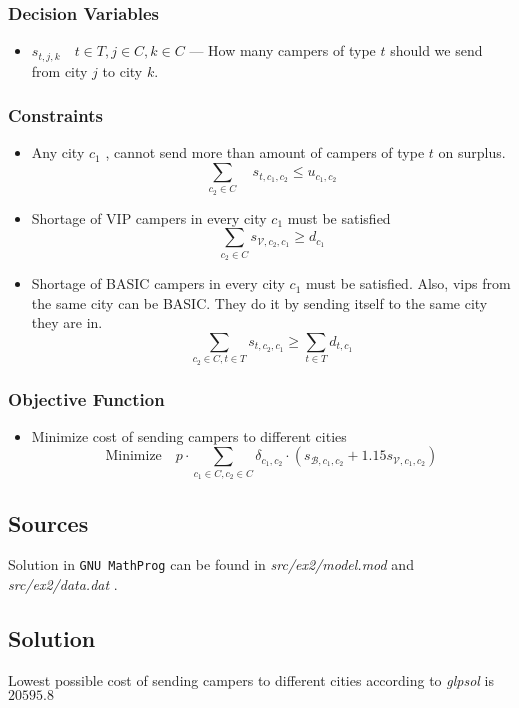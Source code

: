 \subsubsection*{Decision Variables}
\begin{itemize}
    \item $s_{t,j,k} \quad t \in T, j \in C, k \in C$ --- How many campers of type $t$ should we send from city $j$ to city $k$. 
\end{itemize}
\subsubsection*{Constraints}
\begin{itemize}
    \item Any city $c_1$ , cannot send more than amount of campers of type $t$ on surplus.
    $$ \sum_{c_2 \in C} \quad s_{t,c_1,c_2} \leqslant u_{c_1, c_2}$$
    \item Shortage of VIP campers in every city $c_1$ must be satisfied
    $$\sum_{c_2 \in C} s_{\mathcal{V}, c_2, c_1} \geqslant d_{c_1}$$
    \item Shortage of BASIC campers in every city $c_1$ must be satisfied. Also, vips from the same city can be BASIC. They do it by sending itself to the same city they are in.
    $$\sum_{c_2 \in C, t \in T} s_{t, c_2, c_1} \geqslant \sum_{t \in T} d_{t, c_1}$$
\end{itemize}
\subsubsection*{Objective Function}
\begin{itemize}
    \item Minimize cost of sending campers to different cities
    $$\textrm{Minimize} \quad p \cdot \sum_{c_1 \in C, c_2 \in C} \delta_{c_1, c_2} \cdot (s_{\mathcal{B}, c_1, c_2} + 1.15s_{\mathcal{V}, c_1, c_2})$$
\end{itemize}
\subsection{Sources}
Solution in \texttt{GNU MathProg} can be found in \textit{src/ex2/model.mod} and \textit{src/ex2/data.dat} .
\subsection{Solution}
Lowest possible cost of sending campers to different cities according to \textit{glpsol} is $20595.8$